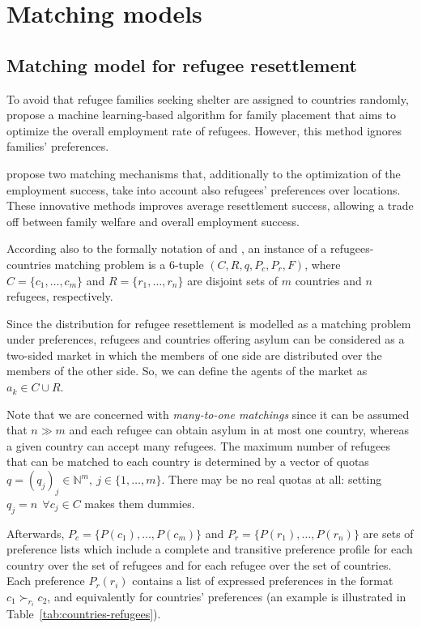 \section{Matching models}\label{matching-models}%


\subsection{Matching model for refugee resettlement}\label{matching-model-for-refugee-resettlement}%

To avoid that refugee families seeking shelter are assigned to countries randomly, \citet{bansak_2018} propose a machine learning-based algorithm for family placement that aims to optimize the overall employment rate of refugees. However, this method ignores families’ preferences.

\citet{olbergml} propose two matching mechanisms that, additionally to the optimization of the employment success, take into account also refugees’ preferences over locations. These innovative methods improves average resettlement success, allowing a trade off between family welfare and overall employment success.

According also to the formally notation of \citet{salles} and \citet{delacretaz_2020}, an instance of a refugees-countries matching problem is a 6-tuple \((C, R, q, P_c, P_r, F)\), where \(C = \{c_1, \dots, c_m\}\) and \(R = \{r_1, \dots, r_n\}\) are disjoint sets of \(m\) countries and \(n\) refugees, respectively.

Since the distribution for refugee resettlement is modelled as a matching problem under preferences, refugees and countries offering asylum can be considered as a two-sided market in which the members of one side are distributed over the members of the other side. So, we can define the agents of the market as \(a_k \in C \cup R\).

Note that we are concerned with \textit{many-to-one matchings} since it can be assumed that \(n \gg m\) and each refugee can obtain asylum in at most one country, whereas a given country can accept many refugees. The maximum number of refugees that can be matched to each country is determined by a vector of quotas \(q = (q_j)_j \in \mathbb{N}^m,\ j \in \{1, \dots, m\}\). There may be no real quotas at all: setting \(q_j = n\ \ \forall c_j \in C\) makes them dummies.

Afterwards, \(P_c = \{P(c_1), \dots, P(c_m)\}\) and \(P_r =\{P(r_1), \dots, P(r_n)\}\) are sets of preference lists which include a complete and transitive preference profile for each country over the set of refugees and for each refugee over the set of countries. Each preference \(P_r(r_i)\) contains a list of expressed preferences in the format \(c_1 \succ_{r_i} c_2\), and equivalently for countries' preferences (an example is illustrated in Table~\ref{tab:countries-refugees}).

